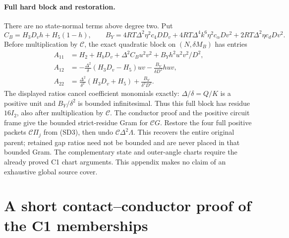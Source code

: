 \paragraph{Full hard block and restoration.}
There are no state-normal terms above degree two. Put
\[
 C_B=H_3D_vh+H_5(1-h),\qquad
 B_Y=4RT\Delta^2\eta^2c_4DD_v
 +4RT\Delta^4k^6\eta^2c_\alpha Dv^2
 +2RT\Delta^2\eta c_dDv^2.
\]
Before multiplication by $\mathcal C$, the exact quadratic block on
$(N,\delta M_B)$ has entries
\begin{align*}
 A_{11}&=H_2+H_bD_v+\Delta^2C_Bu^2v^2+B_Yh^2u^2v^2/D^2,\\
 A_{12}&=-\frac{\Delta^2}{\delta}(H_3D_v-H_5)uv
                  -\frac{B_Y}{\delta D^2}huv,\\
 A_{22}&=\frac{\Delta^2}{\delta^2}(H_3D_v+H_5)
                  +\frac{B_Y}{\delta^2D^2}.
\end{align*}
The displayed ratios cancel coefficient monomials exactly:
$\Delta/\delta=Q/K$ is a positive unit and
$B_Y/\delta^2$ is bounded infinitesimal. Thus this full block has
residue $16I_2$, also after multiplication by $\mathcal C$.
The conductor proof and the positive circuit frame give the bounded
strict-residue Gram for $\mathcal CG$. Restore the four full positive
packets $\mathcal C\Pi_j$ from (SD3), then undo
$\mathcal C\Delta^2\Lambda$. This recovers the entire original parent;
retained gap ratios need not be bounded and are never placed in that
bounded Gram. The complementary state and outer-angle charts require
the already proved C1 chart arguments. This appendix makes no claim of
an exhaustive global source cover.


\section{\texorpdfstring{A short contact--conductor proof of the C1 memberships}{A short contact--conductor proof of the C1 memberships}}
\label{component:pfabc29e28ab3}


